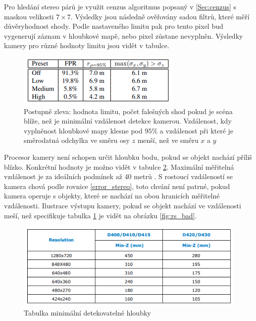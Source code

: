 \documentclass[twoside]{ctuthesis}
\begin{document}
    Pro hledání stereo párů je využit cenzus algoritmus popsaný v \ref{Sec:cenzus} s maskou velikosti $7 \times 7 $. Výsledky jsou následně ověřovány sadou filtrů, které měří důvěryhodnost shody. Podle nastaveného limitu pak pro tento pixel bud vygenerují záznam v hloubkové mapě, nebo pixel zůstane nevyplněn. Výsledky kamery pro různé hodnoty limitu jsou vidět v tabulce. 
\begin{figure}
    \centering
    \includegraphics[width = 0.8\linewidth]{pictures/realsense_threshold.png}
    \caption{Postupně zleva: hodnota limitu, počet falešných shod pokud je scéna blíže, než je minimální vzdálenost detekce kamerou. Vzdálenost, kdy vyplněnost hloubkové mapy klesne pod $95\%$ a vzdálenost při které je směrodatná odchylka ve směru osy $z$ menší, než ve směru $x$ a $y$ \cite{keselman2017intel}}
    \label{fig:tablka_limity}
\end{figure}

Procesor kamery není schopen určit hloubku bodu, pokud se objekt nachází příliš blízko. Konkrétní hodnoty je možno vidět v tabulce \ref{Fig:minimalni_hloubka}. Maximální měřitelná vzdálenost je za ideálních podmínek až 40 metrů \cite{keselman2017intel}. S rostoucí vzdáleností se kamera chová podle rovnice \ref{error_stereo}, toto chvání není patrné, pokud kamera operuje s objekty, které se nachází na obou hranicích měřitelné vzdálenosti. Ilustrace výstupu kamery, pokud se objekt nachází ve vzdálenosti meší, než specifikuje tabulka \ref{fig:tablka_limity} je vidět na obrázku \ref{fig:rs_bad}.

\begin{figure}
    \centering
    \includegraphics[width = 0.8\linewidth]{pictures/minimalni_vzdalenost.png}
    \caption{Tabulka minimální detekovatelné hloubky \cite{RealSense_datasheet}}
    \label{Fig:minimalni_hloubka}
\end{figure}
\end{document}
